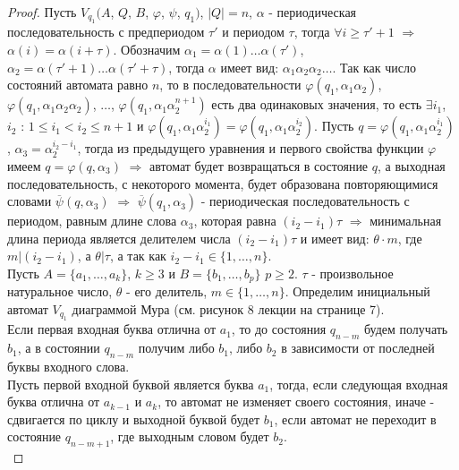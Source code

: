 \documentclass[a4paper, 12pt]{article}
\renewcommand{\phi}{\varphi}
\theoremstyle{definition}
\theoremstyle{plain}
\theoremstyle{remark}
\begin{document}
  \begin{proof}
    Пусть $V_{q_1}(A$, $Q$, $B$, $\phi$, $\psi$, $q_1)$, $|Q|=n$, $\alpha$ - периодическая последовательность с предпериодом $\tau'$ и периодом $\tau$, тогда $\forall i\geqslant\tau'+1$ $\Longrightarrow$ $\alpha(i)=\alpha(i+\tau)$. Обозначим $\alpha_1=\alpha(1)\ldots\alpha(\tau')$, $\alpha_2=\alpha(\tau'+1)\ldots\alpha(\tau'+\tau)$, тогда $\alpha$ имеет вид: $\alpha_1\alpha_2\alpha_2\ldots$. Так как число состояний автомата равно $n$, то в последовательности $\phi(q_1, \alpha_1\alpha_2)$, $\phi(q_1, \alpha_1\alpha_2\alpha_2)$, $\ldots$, $\phi(q_1,\alpha_1\alpha_2^{n+1})$ есть два одинаковых значения, то есть $\exists i_1$, $i_2$ : $1\leqslant i_1< i_2\leqslant n+1$ и $\phi(q_1,\alpha_1\alpha_2^{i_1})=\phi(q_1,\alpha_1\alpha_2^{i_2})$. Пусть $q=\phi(q_1,\alpha_1\alpha_2^{i_1})$, $\alpha_3=\alpha_2^{i_2-i_1}$, тогда из предыдущего уравнения и первого свойства функции $\phi$ имеем $q=\phi(q,\alpha_3)$ $\Longrightarrow$ автомат будет возвращаться в состояние $q$, а выходная последовательность, с некоторого момента, будет образована повторяющимися словами $\overline{\psi}(q,\alpha_3)$ $\Longrightarrow$ $\overline{\psi}(q_1,\alpha_3)$ - периодическая последовательность с периодом, равным длине слова $\alpha_3$, которая равна $(i_2-i_1)\tau$ $\Longrightarrow$ минимальная длина периода является делителем числа $(i_2-i_1)\tau$ и имеет вид: $\theta\cdot m$, где $m|(i_2-i_1)$, а $\theta|\tau$, а так как $i_2-i_1\in\{1,\ldots,n\}$.\\
    Пусть $A=\{a_1,\ldots,a_k\}$, $k\geqslant3$ и $B=\{b_1,\ldots,b_p\}$ $p\geqslant2$. $\tau$ - произвольное натуральное число, $\theta$ - его делитель, $m\in \{1,\ldots,n\}$. Определим инициальный автомат $V_{q_1}$ диаграммой Мура (см. рисунок 8 лекции на странице 7).\\
    Если первая входная буква отлична от $a_1$, то до состояния $q_{n-m}$ будем получать $b_1$, а в состоянии $q_{n-m}$ получим либо $b_1$, либо $b_2$ в зависимости от последней буквы входного слова.\\
    Пусть первой входной буквой является буква $a_1$, тогда, если следующая входная буква отлична от $a_{k-1}$ и $a_k$, то автомат не изменяет своего состояния, иначе - сдвигается по циклу и выходной буквой будет $b_1$, если автомат не переходит в состояние $q_{n-m+1}$, где выходным словом будет $b_2$.\\

\end{proof}
\end{document}
